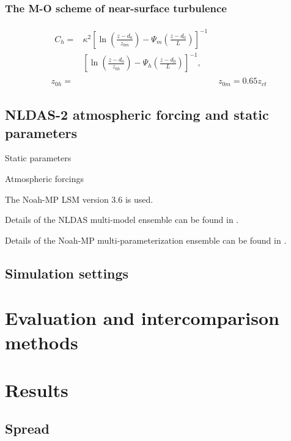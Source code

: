 \documentclass[essd]{copernicus}
\begin{document}
\subsubsection{The M-O scheme of near-surface turbulence}

\begin{align}
    \begin{split}
        C_h = & \kappa^2 \left[ \ln\left(\frac{z-d_0}{z_{0m}}\right)
            - \Psi_{m}\left(\frac{z-d_0}{L}\right) \right]^{-1} \\
        & \left[ \ln\left(\frac{z-d_0}{z_{0h}}\right)
            - \Psi_{h}\left(\frac{z-d_0}{L}\right) \right]^{-1}
        \text{,}
    \end{split}      \\
    z_{0h} = & z_{0m} = 0.65 z_{ct}
\end{align}


\subsection{NLDAS-2 atmospheric forcing and static parameters} \label{sec:data:nldas}

Static parameters

Atmospheric forcings

The Noah-MP LSM version 3.6 is used.

Details of the NLDAS multi-model ensemble can be found in \citet{xia2012JGRA,
xia2012JGRAa, fei2021WRR}.

Details of the Noah-MP multi-parameterization ensemble can be found in
\citet{zheng2019WRR, zheng2020JAMES, fei2021WRR}.


\subsection{Simulation settings} \label{sec:data:simulation}


\section{Evaluation and intercomparison methods} \label{sec:evaluation}


\section{Results} \label{sec:result}

\subsection{Spread}
\end{document}
